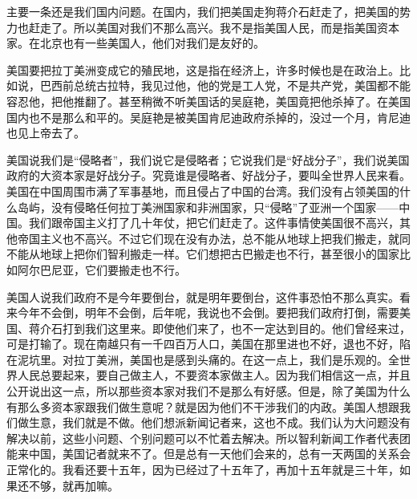 主要一条还是我们国内问题。在国内，我们把美国走狗蒋介石赶走了，把美国的势力也赶走了。所以美国对我们不那么高兴。我不是指美国人民，而是指美国资本家。在北京也有一些美国人，他们对我们是友好的。

美国要把拉丁美洲变成它的殖民地，这是指在经济上，许多时候也是在政治上。比如说，巴西前总统古拉特，我见过他，他的党是工人党，不是共产党，美国都不能容忍他，把他推翻了。甚至稍微不听美国话的吴庭艳，美国竟把他杀掉了。在美国国内也不是那么和平的。吴庭艳是被美国肯尼迪政府杀掉的，没过一个月，肯尼迪也见上帝去了。

美国说我们是“侵略者”，我们说它是侵略者；它说我们是“好战分子”，我们说美国政府的大资本家是好战分子。究竟谁是侵略者、好战分子，要叫全世界人民来看。美国在中国周围市满了军事基地，而且侵占了中国的台湾。我们没有占领美国的什么岛屿，没有侵略任何拉丁美洲国家和非洲国家，只“侵略”了亚洲一个国家——中国。我们跟帝国主义打了几十年仗，把它们赶走了。这件事情使美国很不高兴，其他帝国主义也不高兴。不过它们现在没有办法，总不能从地球上把我们搬走，就同不能从地球上把你们智利搬走一样。它们想把古巴搬走也不行，甚至很小的国家比如阿尔巴尼亚，它们要搬走也不行。

美国人说我们政府不是今年要倒台，就是明年要倒台，这件事恐怕不那么真实。看来今年不会倒，明年不会倒，后年呢，我说也不会倒。要把我们政府打倒，需要美国、蒋介石打到我们这里来。即使他们来了，也不一定达到目的。他们曾经来过，可是打输了。现在南越只有一千四百万人口，美国在那里进也不好，退也不好，陷在泥坑里。对拉丁美洲，美国也是感到头痛的。在这一点上，我们是乐观的。全世界人民总要起来，要自己做主人，不要资本家做主人。因为我们相信这一点，并且公开说出这一点，所以那些资本家对我们不是那么有好感。但是，除了美国为什么有那么多资本家跟我们做生意呢？就是因为他们不干涉我们的内政。美国人想跟我们做生意，我们就是不做。他们想派新闻记者来，这也不成。我们认为大问题没有解决以前，这些小问题、个别问题可以不忙着去解决。所以智利新闻工作者代表团能来中国，美国记者就来不了。但是总有一天他们会来的，总有一天两国的关系会正常化的。我看还要十五年，因为已经过了十五年了，再加十五年就是三十年，如果还不够，就再加嘛。

